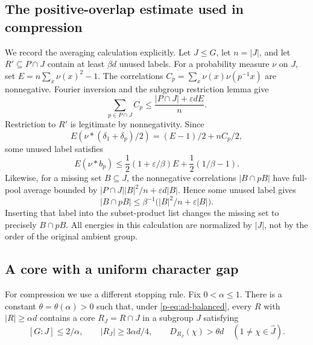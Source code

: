 \documentclass[11pt,a4paper]{article}
\theoremstyle{definition}
\theoremstyle{remark}
\begin{document}
\subsection{The positive-overlap estimate used in compression}

We record the averaging calculation explicitly. Let $J\le G$, let
$n=|J|$, and let $R'\subseteq P\cap J$ contain at least $\beta d$
unused labels. For a probability measure $\nu$ on $J$, set
$E=n\sum_x\nu(x)^2-1$. The correlations
$C_p=\sum_x\nu(x)\nu(p^{-1}x)$ are nonnegative. Fourier inversion and
the subgroup restriction lemma give
\[
 \sum_{p\in P\cap J}C_p
 \le\frac{|P\cap J|+\varepsilon dE}{n}.
\]
Restriction to $R'$ is legitimate by nonnegativity. Since
\[
 E(\nu*(\delta_1+\delta_p)/2)=(E-1)/2+nC_p/2,
\]
some unused label satisfies
\begin{equation}\label{p-eq:positive-energy}
 E(\nu*b_p)\le
 \frac12(1+\varepsilon/\beta)E
 +\frac12(1/\beta-1).
\end{equation}
Likewise, for a missing set $B\subseteq J$, the nonnegative correlations
$|B\cap pB|$ have full-pool average bounded by
$|P\cap J||B|^2/n+\varepsilon d|B|$. Hence some unused label gives
\begin{equation}\label{p-eq:positive-holes}
 |B\cap pB|\le\beta^{-1}
       \bigl(|B|^2/n+\varepsilon|B|\bigr).
\end{equation}
Inserting that label into the subset-product list changes the missing
set to precisely $B\cap pB$. All energies in this calculation are
normalized by $|J|$, not by the order of the original ambient group.

\subsection{A core with a uniform character gap}

For compression we use a different stopping rule. Fix $0<\alpha\leq1$.
There is a constant $\theta=\theta(\alpha)>0$ such that, under
\eqref{p-eq:ad-balanced}, every $R$ with $|R|\geq\alpha d$ contains a
core $R_J=R\cap J$ in a subgroup $J$ satisfying
\begin{equation}\label{p-eq:ad-core}
 [G:J]\leq2/\alpha,
 \qquad |R_J|\geq3\alpha d/4,
 \qquad
 D_{R_J}(\chi)>\theta d
 \quad(1\ne\chi\in\widehat J).
\end{equation}
\end{document}
